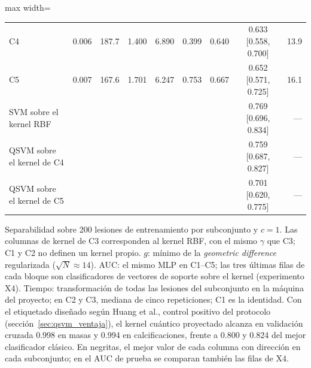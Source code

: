 \begin{table}[H]
\begin{adjustbox}{max width=\linewidth}
\begin{tabular}{l r r r r r r c r}
\quad C4 & 0.006 & 187.7 & 1.400 & 6.890 & 0.399 & 0.640 & 0.633 [0.558, 0.700] & 13.9 \\
\quad C5 & 0.007 & 167.6 & 1.701 & 6.247 & 0.753 & 0.667 & 0.652 [0.571, 0.725] & 16.1 \\
\quad SVM sobre el kernel RBF & \multicolumn{6}{c}{} & 0.769 [0.696, 0.834] & — \\
\quad QSVM sobre el kernel de C4 & \multicolumn{6}{c}{} & 0.759 [0.687, 0.827] & — \\
\quad QSVM sobre el kernel de C5 & \multicolumn{6}{c}{} & 0.701 [0.620, 0.775] & — \\
\bottomrule
\end{tabular}
\end{adjustbox}
\par\smallskip
\parbox{0.95\linewidth}{\footnotesize Separabilidad sobre 200 lesiones de entrenamiento por subconjunto y $c = 1$. Las columnas de kernel de C3 corresponden al kernel RBF, con el mismo $\gamma$ que C3; C1 y C2 no definen un kernel propio. $g$: mínimo de la \textit{geometric difference} regularizada ($\sqrt{N} \approx 14$). AUC: el mismo MLP en C1--C5; las tres últimas filas de cada bloque son clasificadores de vectores de soporte sobre el kernel (experimento X4). Tiempo: transformación de todas las lesiones del subconjunto en la máquina del proyecto; en C2 y C3, mediana de cinco repeticiones; C1 es la identidad. Con el etiquetado diseñado según Huang et al., control positivo del protocolo (sección~\ref{sec:qsvm_ventaja}), el kernel cuántico proyectado alcanza en validación cruzada 0.998 en masas y 0.994 en calcificaciones, frente a 0.800 y 0.824 del mejor clasificador clásico. En negritas, el mejor valor de cada columna con dirección en cada subconjunto; en el AUC de prueba se comparan también las filas de X4.}
\end{table}
